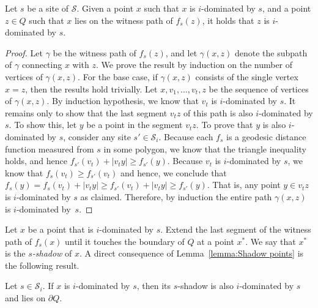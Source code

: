 \documentclass[a4paper,UKenglish]{socg-lipics-v2018}
\newcommand{\icell}[1][i]{${#1}$-patch\xspace}
\newcommand{\idom}[1][i]{${#1}$-dominated\xspace}
\newcommand{\s}{\mathcal S}
\begin{document}
\begin{lemma}\label{lemma:Shadow points}
Let $s$ be a site of $\s$.
Given a point $x$ such that $x$ is \idom by $s$, and a point $z\in Q$ such that $x$ lies on the witness path of $f_s(z)$,
it holds that $z$ is \idom by $s$. 
\end{lemma}
\begin{proof}
Let $\gamma$ be the witness path of $f_s(z)$, and let $\gamma(x, z)$ denote the subpath of $\gamma$ connecting $x$ with $z$.
We prove the result by induction on the number of vertices of $\gamma(x, z)$.
For the base case, if $\gamma(x, z)$ consists of the single vertex $x = z$, then the results hold trivially. 
Let $x , v_1, \ldots, v_t,  z$ be the sequence of vertices of $\gamma(x, z)$. 
By induction hypothesis, we know that $v_t$ is \idom by $s$.
It remains only to show that the last segment $v_t z$ of this path is also \idom by $s$.
To show this, let $y$ be a point in the segment $v_t z$.
To prove that $y$  is also \idom by $s$, consider any site $s'\in \s_i$. 
Because each $f_s$ is a geodesic distance function measured from $s$ in some polygon, we know that the triangle inequality holds, and hence $f_{s'}(v_t) + |v_t y| \geq f_{s'}(y)$.
Because $v_t$ is \idom by $s$, we know that $f_s(v_t) \geq f_{s'}(v_t)$ and hence, we conclude that 
$f_s(y) = f_s(v_t) + |v_t y| \geq f_{s'}(v_t) + |v_t y| \geq f_{s'}(y)$.
That is, any point $y\in v_t z$ is \idom by $s$ as claimed.
Therefore, by induction the entire path $\gamma(x, z)$ is \idom by~$s$.
\end{proof}

Let $x$ be a point that is \idom by $s$. Extend the last segment of the witness path of $f_s(x)$ until it touches the boundary of $Q$ at a point $x^*$.
We say that $x^*$ is the \emph{$s$-shadow} of $x$. A direct consequence of Lemma~\ref{lemma:Shadow points} is the following result.

\begin{corollary}\label{corollary: Shadows in cell as well}
Let $s \in \s_i$.
If $x$ is \idom by $s$, then its $s$-shadow is also \idom by $s$ and lies on $\partial Q$.
\end{corollary}


\end{document}
